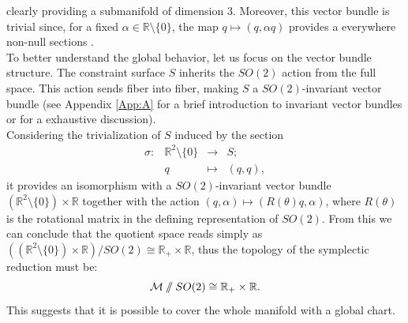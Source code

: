 \documentclass{article}
\numberwithin{equation}{section}
\theoremstyle{definition}
\newcommand{\R}{\mathbb{R}}
\newcommand{\M}{\mathcal{M}}
\newcommand{\sslash}{\mathbin{/\mkern-6mu/}}
\begin{document}
clearly providing a submanifold of dimension 3. Moreover, this vector bundle is trivial since, for a fixed $\alpha \in\R\setminus\{0\}$, the map $q\mapsto(q,\alpha q)$ provides a everywhere non-null sections \cite{Kobayashi_Nomizu_1963}.\\
To better understand the global behavior, let us focus on the vector bundle structure. The constraint surface $S$ inherits the $SO(2)$ action from the full space. This action sends fiber into fiber, making $S$ a $SO(2)$-invariant vector bundle (see Appendix \ref{App:A} for a brief introduction to invariant vector bundles or \cite{Kobayashi_Nomizu_1969} for a exhaustive discussion). \\
Considering the trivialization of $S$ induced by the section
\begin{equation}
\begin{matrix}
    \sigma:&\R^2\setminus\{0\}&\to& S;\\
    & q & \mapsto & (q,q),
\end{matrix} 
\end{equation}
it provides an isomorphism with a $SO(2)$-invariant vector bundle $(\R^2\setminus\{0\})\times\R$ together with the action $(q,\alpha)\mapsto(R(\theta)q,\alpha)$, where $R(\theta)$ is the rotational matrix in the defining representation of $SO(2)$. From this we can conclude that the quotient space reads simply as $((\R^2\setminus\{0\})\times\R)/SO(2)\cong \R_+\times \R $, thus the topology of the symplectic reduction must be:
\begin{equation}
    \M\sslash SO(2)\cong \R_+\times \R.
\end{equation}
This suggests that it is possible to cover the whole manifold with a global chart.

\medskip
\end{document}

